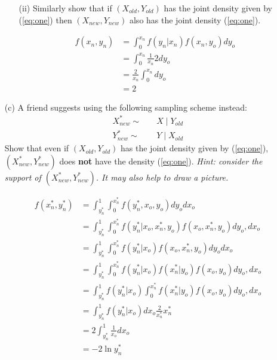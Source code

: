 \documentclass{article}
\newcommand{\1}{\mathbf{1}}
\begin{document}
\begin{enumerate}
\begin{enumerate}
        \item[(ii)] Similarly show that if $(X_{old},Y_{old})$ has the joint density given by (\ref{eq:one}) then  $(X_{new},Y_{new})$ also has the joint density  (\ref{eq:one}).
        
        \begin{align*}
            f(x_n, y_n) &= \int_0^{x_n} f(y_n|x_n)f(x_n,y_o)dy_o \\
            &= \int_0^{x_n} \frac{1}{x_n} 2dy_o \\
            &= \frac{2}{x_n}\int_0^{x_n}dy_o \\
            &=2
        \end{align*}
    \end{enumerate}

    \newpage
    \item[(c)] A friend  suggests using the following sampling scheme instead:
    \begin{align*}
        X^*_{new} \sim &\quad  X \mid Y_{old}\\
        Y^*_{new} \sim &\quad Y \mid X_{old}
    \end{align*}
    Show that even  if $(X_{old},Y_{old})$ has the joint density given by (\ref{eq:one}), $(X^*_{new},Y^*_{new})$ does {\bf not} have the density (\ref{eq:one}). {\it Hint: consider the support of $(X^*_{new},Y^*_{new})$. It may also help to draw a picture.}
    
    \begin{align*}
        f(x^*_n, y^*_n) &= \int_{y^*_n}^1 \int_0^{x^*_n} f(y^*_n, x_o, y_o) dy_o dx_o \\
        &= \int_{y^*_n}^1 \int_0^{x^*_n} f(y^*_n|x_o, x^*_n, y_o) f(x_o, x^*_n, y_o) dy_o, dx_o \\
        &= \int_{y^*_n}^1 \int_0^{x^*_n} f(y^*_n|x_o) f(x_o, x^*_n, y_o) dy_o dx_o\\
        &= \int_{y^*_n}^1 \int_0^{x^*_n} f(y^*_n|x_o) f(x^*_n|y_o) f(x_o, y_o) dy_o, dx_o\\
        &= \int_{y^*_n}^1 f(y^*_n|x_o) \int_0^{x^*_n} f(x^*_n|y_o) f(x_o, y_o) dy_o, dx_o \\
        &=  \int_{y^*_n}^1 f(y^*_n|x_o) dx_o \frac{2}{x^*_n} x^*_n\\
        &= 2 \int_{y^*_n}^1 \frac{1}{x_o} dx_o \\
        &= -2 \ln{y^*_n}
    \end{align*}
\end{enumerate}
\end{document}
